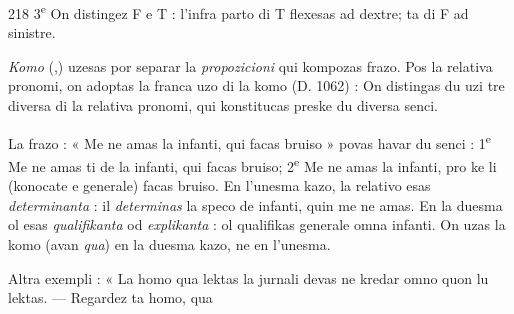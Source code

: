 \begin{VUpage}[222]{218}
3\textsuperscript{e} On distingez F e T : l'infra parto di T flexesas ad\nl
dextre; ta di F ad sinistre.

\textit{Komo} (,) uzesas por separar la \textit{propozicioni} qui kompozas\nl
frazo. Pos la relativa pronomi, on adoptas la franca uzo di\nl
la komo (D. 1062) : On distingas du uzi tre diversa di la\nl
relativa pronomi, qui konstitucas preske du diversa senci.\parplein

La frazo : « Me ne amas la infanti, qui facas bruiso »\nl
povas havar du senci : 1\textsuperscript{e} Me ne amas ti de la infanti, qui\nl
facas bruiso; 2\textsuperscript{e} Me ne amas la infanti, pro ke li (konocate\nl
e generale) facas bruiso. En l'unesma kazo, la relativo esas\nl
\textit{determinanta} : il \textit{determinas} la speco de infanti, quin me ne\nl
amas. En la duesma ol esas \textit{qualifikanta} od \textit{explikanta} : ol\nl
qualifikas generale omna infanti. On uzas la komo (avan\nl
\textit{qua}) en la duesma kazo, ne en l'unesma.

Altra exempli : « La homo qua lektas la jurnali devas ne\nl
kredar omno quon lu lektas. --- Regardez ta homo, qua\nl
\end{VUpage}

